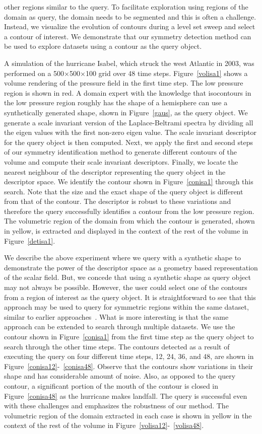 \documentclass[review,journal]{vgtc}         %
\begin{document}
other regions similar to the query. To facilitate exploration using regions of the domain as query, the domain 
needs to be segmented and this is often a challenge. Instead, we visualize the
evolution of contours during a level set sweep and select a contour of interest. 
We demonstrate that our symmetry detection method can be used to explore datasets using a contour as the query object.

A simulation of the hurricane Isabel, which struck the west Atlantic in 2003, was performed
on a 500$\times$500$\times$100 grid over 48 time steps. Figure~\ref{volisa1} shows a volume rendering
of the pressure field in the first time step. The low pressure region
is shown in red. A domain expert with the knowledge that isocontours in the low pressure region
roughly has the shape of a hemisphere can use a synthetically generated shape, shown in 
Figure~\ref{gaus}, as the query object. We generate a scale invariant version of the Laplace-Beltrami
spectra by dividing all the eigen values with the first non-zero eigen value. The scale invariant
descriptor for the query object is then computed. Next, we apply the first and second steps of
our symmetry identification method to generate different contours of the 
volume and compute their scale invariant descriptors. Finally, we locate the nearest neighbour of the descriptor 
representing the query object in the descriptor space. We identify the contour
shown in Figure~\ref{conisa1} through this search. Note that the size and the exact shape of the
query object is different from that of the contour.
The descriptor is robust to these variations and therefore the query successfully identifies 
a contour from the low pressure region. The volumetric region of the domain from which the contour
is generated, shown in yellow, is extracted and displayed in the context of the rest of the volume in 
Figure~\ref{detisa1}. 

We describe the above experiment where we query with
a synthetic shape to demonstrate the power of the descriptor space as a geometry based representation 
of the scalar field. But, we concede that using a synthetic shape as query object may not always be 
possible. However, the user could select one of the contours from a region of interest as the query
object. It is straightforward to see that this approach may be used
to query for symmetric regions within the same dataset, similar to earlier approaches~\cite{ThomN13,MasoodTN13}.
What is more interesting is that the same approach can be extended to search through multiple datasets.
We use the contour shown in Figure~\ref{conisa1} from the first time step as the query object to search through 
the other time steps. The contours detected as a result of executing the query on four different time 
steps, 12, 24, 36, and 48, are shown in Figure~\ref{conisa12}-~\ref{conisa48}. Observe that
the contours show variations in their shape and has considerable amount of noise. 
Also, as opposed to the query contour, a significant portion
of the mouth of the contour is closed in Figure~\ref{conisa48} as the hurricane makes landfall.
The query is successful even with these challenges and emphasizes the robustness of our method.
The volumetric region of the domain extracted in each case is shown in yellow in the context of the rest
of the volume in Figure~\ref{volisa12}-~\ref{volisa48}.
\end{document}
